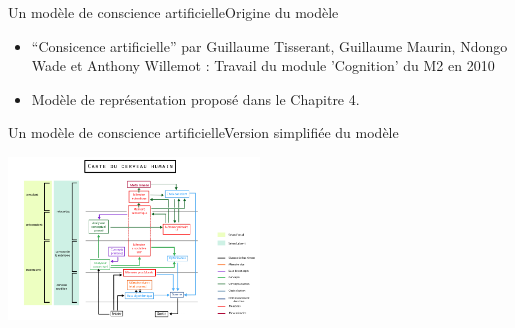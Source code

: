 \begin{frame}{Un modèle de conscience artificielle}{Origine du modèle}
\begin{itemize}
  \item ``Consicence
  artificielle'' par Guillaume Tisserant, Guillaume Maurin, Ndongo Wade
  et Anthony Willemot : Travail du module 'Cognition' du M2 en 2010
  \item Modèle de représentation proposé dans le Chapitre 4.
\end{itemize}
\end{frame}

\begin{frame}{Un modèle de conscience artificielle}{Version simplifiée du
modèle}
\begin{center}
\includegraphics[width=0.5\textwidth]{img/intro/modele_original}
\end{center}
\end{frame}

